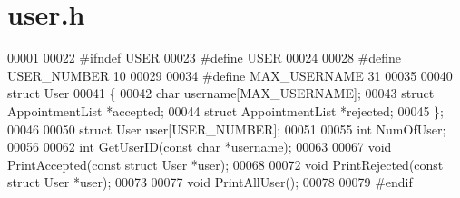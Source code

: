 \section{user.\+h}
\label{user_8h_source}

\begin{DoxyCode}
00001 
00022 \textcolor{preprocessor}{#ifndef USER}
00023 \textcolor{preprocessor}{#define USER}
00024 
00028 \textcolor{preprocessor}{#define USER\_NUMBER 10}
00029 
00034 \textcolor{preprocessor}{#define MAX\_USERNAME 31}
00035 
00040 \textcolor{keyword}{struct }User
00041 \{
00042     \textcolor{keywordtype}{char} username[MAX_USERNAME];
00043     \textcolor{keyword}{struct }AppointmentList *accepted;
00044     \textcolor{keyword}{struct }AppointmentList *rejected;
00045 \};
00046 
00050 \textcolor{keyword}{struct }User user[USER_NUMBER];
00051 
00055 \textcolor{keywordtype}{int} NumOfUser;
00056 
00062 \textcolor{keywordtype}{int} GetUserID(\textcolor{keyword}{const} \textcolor{keywordtype}{char} *username);
00063 
00067 \textcolor{keywordtype}{void} PrintAccepted(\textcolor{keyword}{const} \textcolor{keyword}{struct} User *user);
00068 
00072 \textcolor{keywordtype}{void} PrintRejected(\textcolor{keyword}{const} \textcolor{keyword}{struct} User *user);
00073 
00077 \textcolor{keywordtype}{void} PrintAllUser();
00078 
00079 \textcolor{preprocessor}{#endif}
\end{DoxyCode}
